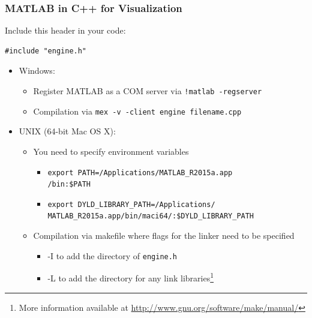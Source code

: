 \documentclass[compress]{beamer}
\newcommand{\tab}{\hspace*{1em}}
\begin{document}
\begin{frame}[fragile]
\frametitle{MATLAB in C++ for Visualization}
Include this header in your code:
\begin{lstlisting}
#include "engine.h"
\end{lstlisting}

\begin{itemize}
	\item Windows:
	\begin{itemize}
		\item Register MATLAB as a COM server via \texttt{!matlab -regserver}
		\item Compilation via \texttt{mex -v -client engine filename.cpp}
	\end{itemize}
	\item UNIX (64-bit Mac OS X):
	\begin{itemize}
		\item You need to specify environment variables
		\begin{itemize}
			\item \texttt{export PATH=/Applications/MATLAB\_R2015a.app} \\
			\tab \texttt{/bin:\$PATH}
			\item \texttt{export DYLD\_LIBRARY\_PATH=/Applications/}\\
			\tab \texttt{MATLAB\_R2015a.app/bin/maci64/:\$DYLD\_LIBRARY\_PATH}
		\end{itemize}
	    \item Compilation via makefile where flags for the linker need to be specified
	    \begin{itemize}
	    	\item -I to add the directory of \texttt{engine.h}
	    	\item -L to add the directory for any link libraries\footnote{More information available at \hyperlink{http://www.gnu.org/software/make/manual/}{http://www.gnu.org/software/make/manual/}}
	    \end{itemize}
	\end{itemize}
\end{itemize}
\end{frame}
\end{document}
